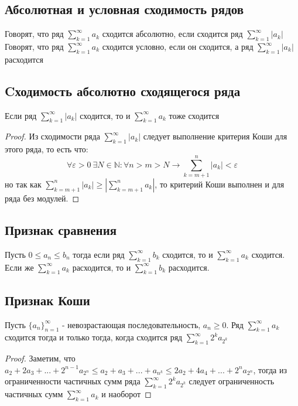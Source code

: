 \documentclass[12pt]{article}
\theoremstyle{definition}
\begin{document}
\subsection{Абсолютная и условная сходимость рядов}
\begin{enumerate}
Говорят, что ряд $\displaystyle\sum_{k = 1}^{\infty}a_k$ сходится абсолютно, если сходится ряд $\displaystyle\sum_{k = 1}^{\infty}|a_k|$ \\
Говорят, что ряд $\displaystyle\sum_{k = 1}^{\infty}a_k$ сходится условно, если он сходится, а ряд $\displaystyle\sum_{k = 1}^{\infty}|a_k|$ расходится 
\end{enumerate}

\subsection{Cходимость абсолютно сходящегося ряда}
Если ряд $\displaystyle\sum_{k = 1}^{\infty}|a_k|$ сходится, то и $\displaystyle\sum_{k = 1}^{\infty}a_k$ тоже сходится
\begin{proof}
Из сходимости ряда $\displaystyle\sum_{k = 1}^{\infty}|a_k|$ следует выполнение критерия Коши для этого ряда, то есть что:
$$\forall \varepsilon > 0 \ \exists N \in \mathbb{N}: \forall n > m > N \to \displaystyle\sum_{k = m + 1}^{n}|a_k| < \varepsilon$$
но так как $\displaystyle\sum_{k = m + 1}^{n}|a_k| \geq \left|\displaystyle\sum_{k = m + 1}^{n}a_k\right|$, то критерий Коши выполнен и для ряда без модулей.
\end{proof}

\subsection{Признак сравнения}
\begin{enumerate}
Пусть $0 \leq a_n \leq b_n$ тогда если ряд $\displaystyle\sum_{k = 1}^{\infty}b_k$ сходится, то и $\displaystyle\sum_{k = 1}^{\infty}a_k$ сходится.\\
Если же $\displaystyle\sum_{k = 1}^{\infty}a_k$ расходится, то и $\displaystyle\sum_{k = 1}^{\infty}b_k$ расходится.
\end{enumerate}

\subsection{Признак Коши}
Пусть $\textstyle\{a_n\}_{n=1}^{\infty}$ - невозрастающая последовательность, $ a_n \geq 0$. Ряд $\displaystyle\sum_{k = 1}^{\infty}a_k$ сходится тогда и только тогда, когда сходится ряд $\displaystyle\sum_{k = 1}^{\infty}2^k a_{2^k}$
\begin{proof}
Заметим, что $a_2 + 2a_3 + ... + 2^{n-1}a_{2^n} \leq a_2 + a_3 + ... + a_{n^k} \leq 2a_2+ 4a_4 + ... + 2^n a_{2^n}$, тогда из ограниченности частичных сумм ряда $
\displaystyle\sum_{k = 1}^{\infty}2^k a_{2^k}$ следует ограниченность частичных сумм $\displaystyle\sum_{k = 1}^{\infty}a_k$ и наоборот
\end{proof}
\end{document}

